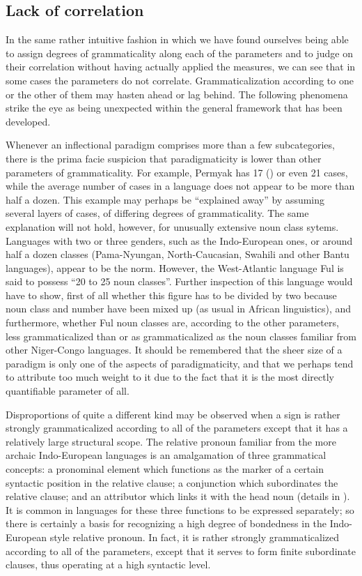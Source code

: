 \subsection{Lack of correlation} \label{sec:4.4.3}

In the same rather intuitive fashion in which we have found ourselves being able to assign degrees of grammaticality along each of the parameters and to judge on their correlation without having actually applied the measures, we can see that in some cases the parameters do not correlate. Grammaticalization according to one or the other of them may hasten ahead or lag behind. The following phenomena strike the eye as being unexpected within the general framework that has been developed.

Whenever an inflectional paradigm comprises more than a few subcategories, there is the prima facie suspicion that paradigmaticity is lower than other parameters of grammaticality. For example, Permyak has 17 (\citet[119]{Comrie1981a}) or even 21 \citep[238]{Austerlitz1980} cases, while the average number of cases in a language does not appear to be more than half a dozen. This example may perhaps be “explained away” by assuming several layers of cases, of differing degrees of grammaticality. The same explanation will not hold, however, for unusually extensive noun class sytems. Languages with two or three genders, such as the Indo-European ones, or around half a dozen classes (Pama-Nyungan, North-Caucasian, Swahili and other Bantu languages), appear to be the norm. However, the West-Atlantic language Ful is said \citep[51]{HeineEtAl1981} to possess “20 to 25 noun classes”. Further inspection of this language would have to show, first of all whether this figure has to be divided by two because noun class and number have been mixed up (as usual in African linguistics), and furthermore, whether Ful noun classes are, according to the other parameters, less grammaticalized than or as grammaticalized as the noun classes familiar from other Niger-Congo languages. It should be remembered that the sheer size of a paradigm is only one of the aspects of paradigmaticity, and that we perhaps tend to attribute too much weight to it due to the fact that it is the most directly quantifiable parameter of all.

Disproportions of quite a different kind may be observed when a sign is rather strongly grammaticalized according to all of the parameters except that it has a relatively large structural scope. The relative pronoun familiar from the more archaic Indo-European languages is an amalgamation of three grammatical concepts: a pronominal element which functions as the marker of a certain syntactic position in the relative clause; a conjunction which subordinates the relative clause; and an attributor which links it with the head noun (details in \citealt[Ch.~\textsc{iv}.4]{Lehmann1984}). It is common in languages for these three functions to be expressed separately; so there is certainly a basis for recognizing a high degree of bondedness in the Indo-European style relative pronoun. In fact, it is rather strongly grammaticalized according to all of the parameters, except that it serves to form finite subordinate clauses, thus operating at a high syntactic level.

